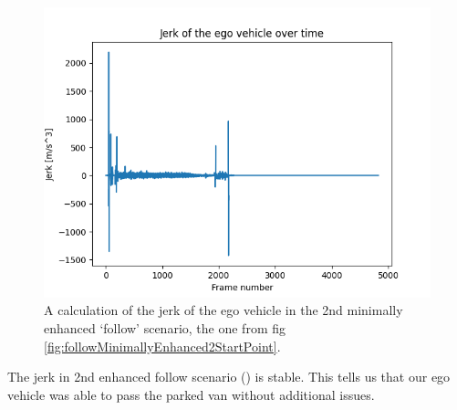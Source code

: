 \begin{figure}[htb]
    \centering
    \includegraphics[width=\textwidth]{experiment-material/follow-minimally-enhanced-2-jerk.png}
    \caption{A calculation of the jerk of the ego vehicle in the 2nd minimally enhanced `follow' scenario,
        the one from fig \ref{fig:followMinimallyEnhanced2StartPoint}.}\label{fig:followMinimallyEnhanced2Jerk}
\end{figure}

The jerk in 2nd enhanced follow scenario () is stable. This
tells us that our ego vehicle was able to pass the parked van without additional issues.